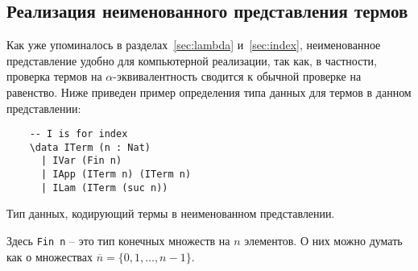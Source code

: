 \subsection{Реализация неименованного представления термов}

Как уже упоминалось в разделах~\ref{sec:lambda} и~\ref{sec:index}, неименованное представление удобно для компьютерной реализации, так как, в частности, проверка термов на $\alpha$-эквивалентность сводится к обычной проверке на равенство. Ниже приведен пример определения типа данных для термов в данном представлении:

\begin{listing}[H]
  \begin{verbatim}
    -- I is for index
    \data ITerm (n : Nat)
      | IVar (Fin n)
      | IApp (ITerm n) (ITerm n)
      | ILam (ITerm (suc n))
  \end{verbatim}
  \caption{Тип данных, кодирующий термы в неименованном представлении.}
\end{listing}

Здесь \texttt{Fin n} -- это тип конечных множеств на $n$ элементов. О них можно думать как о множествах $\overline{n} = \{0,1, \dots, n-1\}$.

